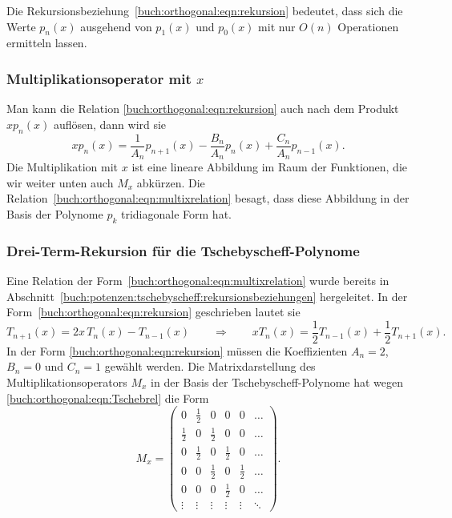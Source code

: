 Die Rekursionsbeziehung~\eqref{buch:orthogonal:eqn:rekursion} bedeutet,
dass sich die Werte $p_n(x)$ ausgehend von $p_1(x)$ und
$p_0(x)$ mit nur $O(n)$ Operationen ermitteln lassen.

%
%
\subsubsection{Multiplikationsoperator mit $x$}
%
Man kann die Relation \eqref{buch:orthogonal:eqn:rekursion}
auch nach dem Produkt $xp_n(x)$ auflösen, dann wird sie
\begin{equation}
xp_n(x)
=
\frac{1}{A_n}p_{n+1}(x)
-
\frac{B_n}{A_n}p_n(x)
+
\frac{C_n}{A_n}p_{n-1}(x).
\label{buch:orthogonal:eqn:multixrelation}
\end{equation}
Die Multiplikation mit $x$ ist eine lineare Abbildung im Raum der Funktionen,
die wir weiter unten auch $M_x$ abkürzen.
Die Relation~\eqref{buch:orthogonal:eqn:multixrelation} besagt, dass diese
Abbildung in der Basis der Polynome $p_k$ tridiagonale Form hat.

%
%
\subsubsection{Drei-Term-Rekursion für die Tschebyscheff-Polynome}
Eine Relation der Form~\eqref{buch:orthogonal:eqn:multixrelation}
wurde bereits in 
Abschnitt~\ref{buch:potenzen:tschebyscheff:rekursionsbeziehungen}
hergeleitet.
In der Form~\eqref{buch:orthogonal:eqn:rekursion} geschrieben lautet
sie
\begin{equation}
T_{n+1}(x) = 2x\,T_n(x)-T_{n-1}(x)
\qquad\Rightarrow\qquad
xT_n(x) = \frac12 T_{n-1}(x) + \frac12 T_{n+1}(x).
\label{buch:orthogonal:eqn:Tschebrel}
\end{equation}
In der Form
\eqref{buch:orthogonal:eqn:rekursion}
müssen die Koeffizienten
$A_n=2$, $B_n=0$ und $C_n=1$ gewählt werden.
Die Matrixdarstellung des Multiplikationsoperators $M_x$ in der
Basis der Tschebyscheff-Polynome hat wegen
\eqref{buch:orthogonal:eqn:Tschebrel}
die Form
\begin{equation}
M_x
=
\begin{pmatrix}
      0&\frac12&      0&      0&      0&\dots  \\
\frac12&      0&\frac12&      0&      0&\dots  \\
      0&\frac12&      0&\frac12&      0&\dots  \\
      0&      0&\frac12&      0&\frac12&\dots  \\
      0&      0&      0&\frac12&      0&\dots  \\
 \vdots& \vdots& \vdots& \vdots& \vdots&\ddots 
\end{pmatrix}.
\label{buch:orthogonal:eqn:Mx}
\end{equation}

